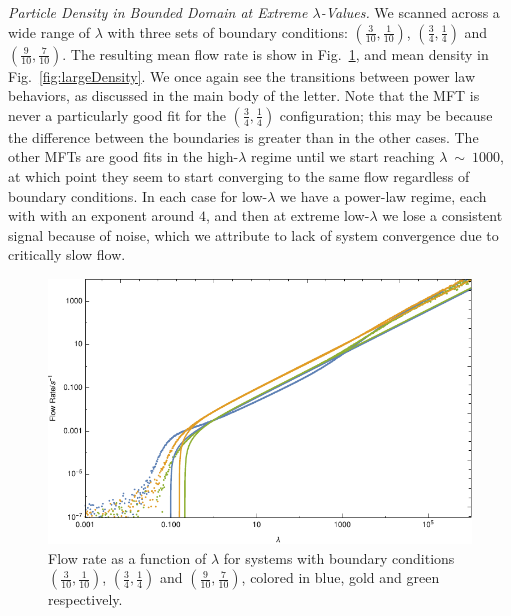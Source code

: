 \documentclass[
reprint,
 amsmath,amssymb,
 aps,
 prl,
]{revtex4-1}
\begin{document}
\textit{Particle Density in Bounded Domain at Extreme $\lambda$-Values.}
We scanned across a wide range of $\lambda$ with three sets of boundary conditions: $(\frac{3}{10}, \frac{1}{10})$, $(\frac{3}{4}, \frac{1}{4})$ and $(\frac{9}{10}, \frac{7}{10})$. The resulting mean flow rate is show in
Fig.~\ref{fig:largeFlow}, and mean density in Fig.~\ref{fig:largeDensity}. We once again see the transitions between power law behaviors, as discussed in the main body of the letter. Note that the MFT is never a particularly good
fit for the $(\frac{3}{4}, \frac{1}{4})$ configuration; this may be because the difference between the boundaries is greater than in the other cases. The other MFTs are good fits in the high-$\lambda$ regime until we start reaching $\lambda~\sim~1000$,
at which point they seem to start converging to the same flow regardless of boundary conditions. In each case for low-$\lambda$ we have a power-law regime, each with with an exponent around $4$, and then at extreme low-$\lambda$ we lose
a consistent signal because of noise, which we attribute to lack of system convergence due to critically slow flow.
\begin{figure}[h!]
\vspace{1em}
\caption{\label{fig:largeFlow} Flow rate as a function of $\lambda$ for systems with boundary conditions $(\frac{3}{10}, \frac{1}{10})$, $(\frac{3}{4}, \frac{1}{4})$ and $(\frac{9}{10}, \frac{7}{10})$, colored in blue, gold and green
respectively.}
    \includegraphics[width=0.95\linewidth]{images/largeRangeFlow}
    \vspace{0em}
\end{figure}
\end{document}
